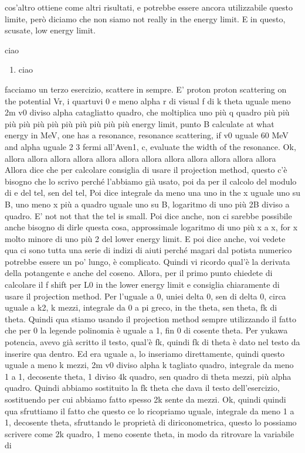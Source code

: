 {\begin{soluzione}
cos'altro ottiene come altri risultati, e potrebbe essere ancora utilizzabile questo limite, però diciamo che non siamo not really in the energy limit. E in questo, scusate, low energy limit. 
\end{soluzione}

\newpage
\setcounter{equation}{0}

\begin{esercizio}
   ciao
   \begin{enumerate}[label=\alph*), leftmargin=0.6cm]
      \item ciao
   \end{enumerate}
\end{esercizio}
\begin{soluzione}
   facciamo un terzo esercizio, scattere in sempre. E' proton proton scattering on the potential Vr, i quartuvi 0 e meno alpha r di visual f di k theta uguale meno 2m v0 diviso alpha catagliatto quadro, che moltiplica uno più q quadro più più più più più più più più più più più energy limit, punto B calculate at what energy in MeV, one has a resonance, resonance scattering, if v0 uguale 60 MeV and alpha uguale 2 3 fermi all'Aven1, c, evaluate the width of the resonance. Ok, allora allora allora allora allora allora allora allora allora allora allora allora Allora dice che per calcolare consiglia di usare il projection method, questo c'è bisogno che lo scrivo perché l'abbiamo già usato, poi da per il calcolo del modulo di e del tel, sen del tel, Poi dice integrale da meno una uno in the x uguale uno su B, uno meno x più a quadro uguale uno su B, logaritmo di uno più 2B diviso a quadro. E' not not that the tel is small. Poi dice anche, non ci sarebbe possibile anche bisogno di dirle questa cosa, approssimale logaritmo di uno più x a x, for x molto minore di uno più 2 del lower energy limit. E poi dice anche, voi vedete qua ci sono tutta una serie di indizi di aiuti perché magari dal potista numerico potrebbe essere un po' lungo, è complicato. Quindi vi ricordo qual'è la derivata della potangente e anche del coseno. Allora, per il primo punto chiedete di calcolare il f shift per L0 in the lower energy limit e consiglia chiaramente di usare il projection method. Per l'uguale a 0, uniei delta 0, sen di delta 0, circa uguale a k2, k mezzi, integrale da 0 a pi greco, in the theta, sen theta, fk di theta. Quindi qua stiamo usando il projection method sempre utilizzando il fatto che per 0 la legende polinomia è uguale a 1, fin 0 di cosente theta. Per yukawa potencia, avevo già scritto il testo, qual'è fk, quindi fk di theta è dato nel testo da inserire qua dentro. Ed era uguale a, lo inseriamo direttamente, quindi questo uguale a meno k mezzi, 2m v0 diviso alpha k tagliato quadro, integrale da meno 1 a 1, decosente theta, 1 diviso 4k quadro, sen quadro di theta mezzi, più alpha quadro. Quindi abbiamo sostituito la fk theta che dava il testo dell'esercizio, sostituendo per cui abbiamo fatto spesso 2k sente da mezzi. Ok, quindi quindi qua sfruttiamo il fatto che questo ce lo ricopriamo uguale, integrale da meno 1 a 1, decosente theta, sfruttando le proprietà di diriconometrica, questo lo possiamo scrivere come 2k quadro, 1 meno cosente theta, in modo da ritrovare la variabile di 
\end{soluzione}}
